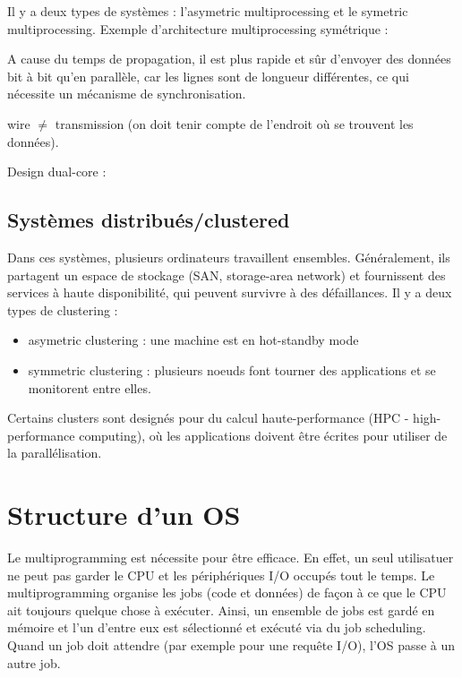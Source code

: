 	
	Il y a deux types de systèmes : l'asymetric multiprocessing et le symetric multiprocessing. Exemple d'architecture multiprocessing symétrique :
	
	
	A cause du temps de propagation, il est plus rapide et sûr d'envoyer des données bit à bit qu'en parallèle, car les lignes sont de longueur différentes, ce qui nécessite un mécanisme de synchronisation.
	
	wire $\neq$ transmission (on doit tenir compte de l'endroit où se trouvent les données).
	
	Design dual-core :
		
	
		\subsection{Systèmes distribués/clustered}
		
		Dans ces systèmes, plusieurs ordinateurs travaillent ensembles. Généralement, ils partagent un espace de stockage (SAN, storage-area network) et fournissent des services à haute disponibilité, qui peuvent survivre à des défaillances. Il y a deux types de clustering :
		
		\begin{itemize}
			\item asymetric clustering : une machine est en hot-standby mode
			\item symmetric clustering : plusieurs noeuds font tourner des applications et se monitorent entre elles.
		\end{itemize}
		
		Certains clusters sont designés pour du calcul haute-performance (HPC - high-performance computing), où les applications doivent être écrites pour utiliser de la parallélisation.
		
	\section{Structure d'un OS}
	
	Le multiprogramming est nécessite pour être efficace. En effet, un seul utilisatuer ne peut pas garder le CPU et les périphériques I/O occupés tout le temps. Le multiprogramming organise les jobs (code et données) de façon à ce que le CPU ait toujours quelque chose à exécuter. Ainsi, un ensemble de jobs est gardé en mémoire et l'un d'entre eux est sélectionné et exécuté via du job scheduling. Quand un job doit attendre (par exemple pour une requête I/O), l'OS passe à un autre job.
	
